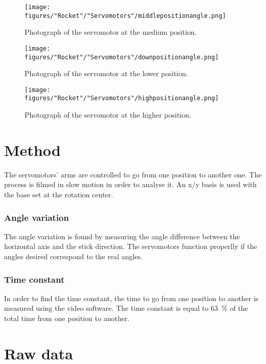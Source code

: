 \begin{figure} [htbp]
	\centering
	\texttt{[image: figures/"Rocket"/"Servomotors"/middlepositionangle.png]}
	\caption{Photograph of the servomotor at the medium position.} \label{fig:ServoInitialPosition}
\end{figure}

\begin{figure} [htbp]
	\centering
	\texttt{[image: figures/"Rocket"/"Servomotors"/downpositionangle.png]}
	\caption{Photograph of the servomotor at the lower position.} \label{fig:ServoLowPosition}
\end{figure}

\begin{figure} [htbp]
	\centering
	\texttt{[image: figures/"Rocket"/"Servomotors"/highpositionangle.png]}
	\caption{Photograph of the servomotor at the higher position.} \label{fig:ServoHighPosition}
\end{figure}


	\section*{Method}
	
 The servomotors' arms are controlled to go from one position to another one. The process is filmed in slow motion in order to analyse it. An x/y basis is used with the base set at the rotation center.
  
		\subsubsection*{Angle variation}
		
The angle variation is found by measuring the angle difference between the horizontal axis and the stick direction. The servomotors function properlly if the angles desired correspond to the real angles.

		\subsubsection*{Time constant}
		
In order to find the time constant, the time to go from one position to another is measured using the video software. The time constant is equal to \SI{63}{\percent} of the total time from one position to another. 



	\section*{Raw data}
	
